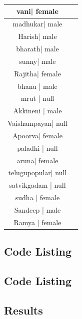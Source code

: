 \begin{table}
\begin{center}
\begin{tabular}{| c | c |}
vani| 		female\\ \hline	
madhukar| 	male\\ \hline
Harish| 		male\\ \hline	
bharath|		male\\ \hline
sunny| 		male\\ \hline
Rajitha| 	female\\ \hline
bhanu	|	male\\ \hline		
mrut		|		null\\ \hline		
Akkineni				|	male\\ \hline		
Vaishampayan|			null\\ \hline		
Apoorva|	female\\ \hline
paladhi			|	null\\ \hline	
aruna| 		female\\ \hline
telugupopular| 		null\\ \hline
satvikgadam		|		null\\ \hline	
sudha		|		female\\ \hline
Sandeep   |  	male\\ \hline	
Ramya   |  	female\\ \hline	
    
\end{tabular}
\end{center}
\end{table}
\newpage

\subsection{Code Listing}


\newpage

\subsection{Code Listing}


\newpage

\subsection{Results}

